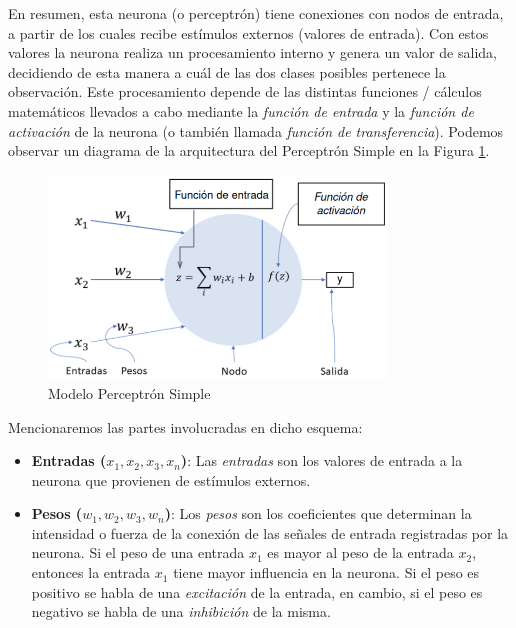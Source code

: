 \documentclass[12pt,a4paper]{article}
\begin{document}
\begin{sloppypar}
En resumen, esta neurona (o perceptrón) tiene conexiones con nodos de entrada, a partir de los cuales recibe estímulos externos (valores de entrada). Con estos valores la neurona realiza un procesamiento interno y genera un valor de salida, decidiendo de esta manera a cuál de las dos clases posibles pertenece la observación\cite{ANN_21}. Este procesamiento depende de las distintas funciones / cálculos matemáticos llevados a cabo mediante la \textit{función de entrada} y la \textit{función de activación} de la neurona (o también llamada \textit{función de transferencia})\cite{ANN_22}. Podemos observar un diagrama de la arquitectura del Perceptrón Simple en la Figura \ref{fig:ann_1}. 

\begin{figure}[H]    %
 \centering
 \includegraphics[width=0.8\textwidth]{images/ANN/1-ANN.png}
 \caption{Modelo Perceptrón Simple} 
 \label{fig:ann_1}
\end{figure}

Mencionaremos las partes involucradas en dicho esquema:
\begin{itemize}
\item \textbf{Entradas ($x_1, x_2, x_3, x_n$)}: Las \textit{entradas} son los valores de entrada a la neurona que provienen de estímulos externos. 

\item \textbf{Pesos ($w_1, w_2, w_3, w_n$)}: Los \textit{pesos} son los coeficientes que determinan la intensidad o fuerza de la conexión de las señales de entrada registradas por la neurona. Si el peso de una entrada $x_1$ es mayor al peso de la entrada $x_2$, entonces la entrada $x_1$ tiene mayor influencia en la neurona. Si el peso es positivo se habla de una \textit{excitación} de la entrada, en cambio, si el peso es negativo se habla de una \textit{inhibición} de la misma.


\end{itemize}
\end{sloppypar}
\end{document}
